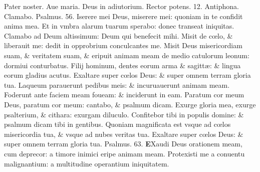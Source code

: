 \documentclass[a5paper,10pt]{book}
\def\ae{æ}
\def\oe{œ}
\begin{document}
\begin{multicols*}{2}
\vspace{-1em}
\par \noindent \color{red} P\color{black}ater noster. Aue maria. Deus in adiutorium. Rector potens. 12. \color{red} Antiphona. \color{black} Clamabo. \color{red} Psalmus. 56. \color{black}
Iserere mei Deus, miserere mei: quoniam in te confidit anima mea.
\newline \color{red} E\color{black}t in vmbra alarum tuarum sperabo: donec transeat iniquitas.
\newline \color{red} C\color{black}lamabo ad Deum altissimum: Deum qui benefecit mihi.
\newline \color{red} M\color{black}isit de c\oe lo, \& liberauit me: dedit in opprobrium conculcantes me.
\newline \color{red} M\color{black}isit Deus misericordiam suam, \& veritatem suam, \& eripuit animam meam de medio catulorum leonum: dormiui conturbatus.
\newline \color{red} F\color{black}ilij hominum, dentes eorum arma \& sagitt\ae : \& lingua eorum gladius acutus.
\newline \color{red} E\color{black}xaltare super c\oe los Deus: \& super omnem terram gloria tua. %
\newline \color{red} L\color{black}aqueum parauerunt pedibus meis: \& incuruauerunt animam meam.
\newline \color{red} F\color{black}oderunt ante faciem meam foueam: \& inciderunt in eam.
\newline \color{red} P\color{black}aratum cor meum Deus, paratum cor meum: cantabo, \& psalmum dicam.
\newline \color{red} E\color{black}xurge gloria mea, exurge psalterium, \& cithara: exurgam diluculo.
\newline \color{red} C\color{black}onfitebor tibi in populis domine: \& psalmum dicam tibi in gentibus.
\newline \color{red} Q\color{black}uoniam magnificata est vsque ad c\oe los misericordia tua, \& vsque ad nubes veritas tua.
\newline \color{red} E\color{black}xaltare super c\oe los Deus: \& super omnem terram gloria tua. \color{red} Psalmus. 63. \color{black}
\vspace{-1.5em}
\lettrine[lines=2]{\bfseries \color{red} E}{}Xaudi Deus orationem meam, cum deprecor: a timore inimici eripe animam meam.
\newline \color{red} P\color{black}rotexisti me a conuentu malignantium: a multitudine operantium iniquitatem.

\end{multicols*}
\end{document}
